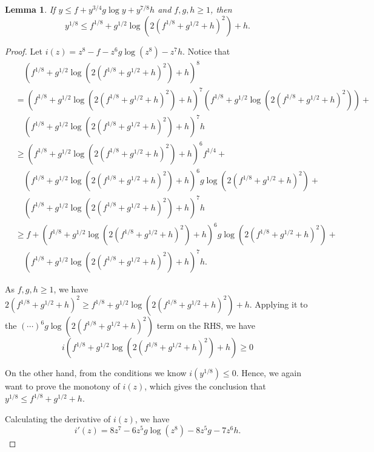 \documentclass[11pt,fullpage,letterpaper]{article} %
\newtheorem{lemma}[theorem]{Lemma}
\begin{document}
\begin{lemma}\label{lem:3/4 and 7/8 self-bounding}
If $y \le f + y^{3/4} g \log y + y^{7/8} h$ and $f,g,h\ge 1$, then
\begin{equation*}
y^{1/8}\le f^{1/8} + g^{1/2} \log \left (2(f^{1/8}+g^{1/2}+h)^2\right ) + h.
\end{equation*}
\end{lemma}
\begin{proof}
Let $i(z) = z^8 - f - z^6 g \log (z^8) - z^7 h$. Notice that
\begin{align*}
&\quad \left (f^{1/8} + g^{1/2} \log \left (2(f^{1/8}+g^{1/2}+h)^2\right ) + h\right )^8 \\
&=\left (f^{1/8} + g^{1/2} \log \left (2(f^{1/8}+g^{1/2}+h)^2\right ) + h\right )^7 \left (f^{1/8} + g^{1/2} \log \left (2(f^{1/8}+g^{1/2}+h)^2\right )\right ) + \\
&\quad \left (f^{1/8} + g^{1/2} \log \left (2(f^{1/8}+g^{1/2}+h)^2\right ) + h\right )^7 h\\
&\ge \left (f^{1/8} + g^{1/2} \log \left (2(f^{1/8}+g^{1/2}+h)^2\right ) + h\right )^6 f^{1/4} + \\
&\quad \left (f^{1/8} + g^{1/2} \log \left (2(f^{1/8}+g^{1/2}+h)^2\right ) + h\right )^6 g \log \left (2(f^{1/8}+g^{1/2}+h)^2\right ) + \\
&\quad \left (f^{1/8} + g^{1/2} \log \left (2(f^{1/8}+g^{1/2}+h)^2\right ) + h\right )^7 h \\
&\ge f + \left (f^{1/8} + g^{1/2} \log \left (2(f^{1/8}+g^{1/2}+h)^2\right ) + h\right )^6 g \log \left (2(f^{1/8}+g^{1/2}+h)^2\right ) + \\
&\quad \left (f^{1/8} + g^{1/2} \log \left (2(f^{1/8}+g^{1/2}+h)^2\right ) + h\right )^7 h.
\end{align*}

As $f,g,h\ge 1$, we have $2(f^{1/8}+g^{1/2}+h)^2\ge f^{1/8} + g^{1/2} \log \left (2(f^{1/8}+g^{1/2}+h)^2\right ) + h$. Applying it to the $(\cdots)^6 g \log(2(f^{1/8}+g^{1/2}+h)^2)$ term on the RHS, we have
\begin{equation*}
i\left (f^{1/8} + g^{1/2} \log \left (2(f^{1/8}+g^{1/2}+h)^2\right )+h\right )\ge 0
\end{equation*}

On the other hand, from the conditions we know $i(y^{1/8})\le 0$. Hence, we again want to prove the monotony of $i(z)$, which gives the conclusion that $y^{1/8}\le f^{1/8} + g^{1/2} + h$.

Calculating the derivative of $i(z)$, we have
\begin{equation*}
i'(z) = 8z^7 - 6z^5 g \log(z^8) - 8 z^5 g - 7z^6 h.
\end{equation*}


\end{proof}
\end{document}
